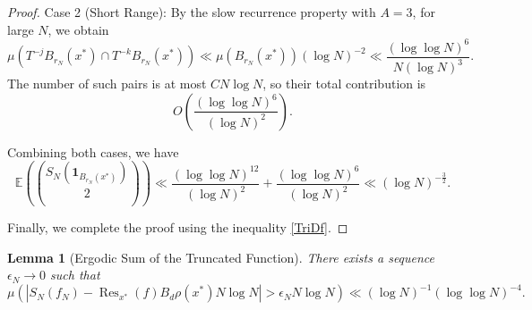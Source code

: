 \documentclass[11pt,twoside,a4paper,reqno]{amsart}
\newtheorem{lemma}[theorem]{Lemma}
\begin{document}
\begin{proof}
Case 2 (Short Range): By the slow recurrence property with $A = 3$, for large $N$, we obtain
$$
\mu\left( T^{-j} B_{r_N}(x^*) \cap T^{-k} B_{r_N}(x^*) \right) \ll \mu(B_{r_N}(x^*)) (\log N)^{-2} \ll \frac{(\log\log N)^6}{N (\log N)^3}.
$$
The number of such pairs is at most $C N \log N$, so their total contribution is
\begin{equation*}
O\left( \frac{(\log\log N)^6}{(\log N)^2} \right).
\end{equation*}



Combining both cases, we have
$$
\mathbb{E}\left( \binom{S_N(\mathbf{1}_{B_{r_N}(x^*)})}{2} \right) \ll \frac{(\log \log N)^{12}}{(\log N)^2} + \frac{(\log\log N)^6}{(\log N)^2} \ll (\log N)^{-\frac{3}{2}}.
$$

Finally, we complete the proof using the inequality \eqref{TriDf}.
\end{proof}


\begin{lemma}[Ergodic Sum of the Truncated Function]\label{ESTF}
There exists a sequence $\epsilon_N \to 0$ such that
$$
\mu\left( \left| S_N(f_N)-\operatorname{Res}_{x^*}(f)B_d \rho(x^*) N \log N \right| > \epsilon_N N \log N \right) \ll (\log N)^{-1} (\log \log N)^{-4}.
$$
\end{lemma}
\end{document}
